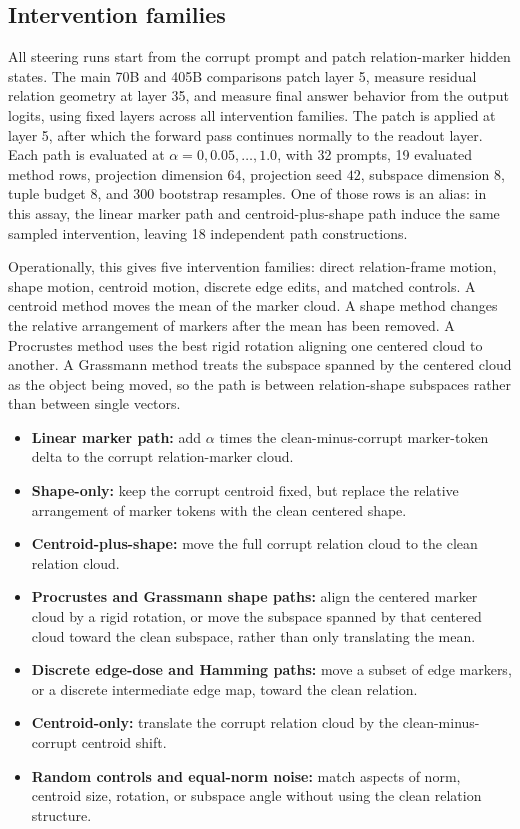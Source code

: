 \documentclass[11pt]{article}
\begin{document}
\subsection{Intervention families}

All steering runs start from the corrupt prompt and patch relation-marker hidden states. The main 70B and 405B comparisons patch layer 5, measure residual relation geometry at layer 35, and measure final answer behavior from the output logits, using fixed layers across all intervention families. The patch is applied at layer 5, after which the forward pass continues normally to the readout layer. Each path is evaluated at $\alpha=0,0.05,\ldots,1.0$, with 32 prompts, 19 evaluated method rows, projection dimension $64$, projection seed $42$, subspace dimension $8$, tuple budget $8$, and 300 bootstrap resamples. One of those rows is an alias: in this assay, the linear marker path and centroid-plus-shape path induce the same sampled intervention, leaving 18 independent path constructions.

Operationally, this gives five intervention families: direct relation-frame motion, shape motion, centroid motion, discrete edge edits, and matched controls. A centroid method moves the mean of the marker cloud. A shape method changes the relative arrangement of markers after the mean has been removed. A Procrustes method uses the best rigid rotation aligning one centered cloud to another. A Grassmann method treats the subspace spanned by the centered cloud as the object being moved, so the path is between relation-shape subspaces rather than between single vectors.

\begin{itemize}
\item \textbf{Linear marker path:} add $\alpha$ times the clean-minus-corrupt marker-token delta to the corrupt relation-marker cloud.
\item \textbf{Shape-only:} keep the corrupt centroid fixed, but replace the relative arrangement of marker tokens with the clean centered shape.
\item \textbf{Centroid-plus-shape:} move the full corrupt relation cloud to the clean relation cloud.
\item \textbf{Procrustes and Grassmann shape paths:} align the centered marker cloud by a rigid rotation, or move the subspace spanned by that centered cloud toward the clean subspace, rather than only translating the mean.
\item \textbf{Discrete edge-dose and Hamming paths:} move a subset of edge markers, or a discrete intermediate edge map, toward the clean relation.
\item \textbf{Centroid-only:} translate the corrupt relation cloud by the clean-minus-corrupt centroid shift.
\item \textbf{Random controls and equal-norm noise:} match aspects of norm, centroid size, rotation, or subspace angle without using the clean relation structure.
\end{itemize}
\end{document}

